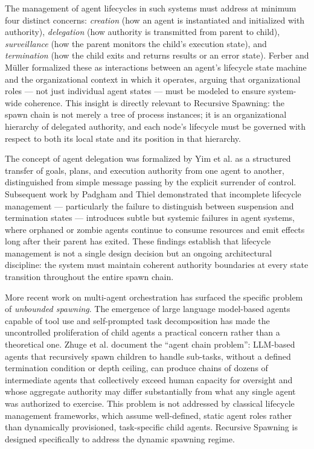The management of agent lifecycles in such systems must address at minimum four distinct concerns: \emph{creation} (how an agent is instantiated and initialized with authority), \emph{delegation} (how authority is transmitted from parent to child), \emph{surveillance} (how the parent monitors the child's execution state), and \emph{termination} (how the child exits and returns results or an error state). Ferber and M\"uller \cite{ferber1996} formalized these as interactions between an agent's lifecycle state machine and the organizational context in which it operates, arguing that organizational roles --- not just individual agent states --- must be modeled to ensure system-wide coherence. This insight is directly relevant to Recursive Spawning: the spawn chain is not merely a tree of process instances; it is an organizational hierarchy of delegated authority, and each node's lifecycle must be governed with respect to both its local state and its position in that hierarchy.

The concept of agent delegation was formalized by Yim et al. \cite{yim1997} as a structured transfer of goals, plans, and execution authority from one agent to another, distinguished from simple message passing by the explicit surrender of control. Subsequent work by Padgham and Thiel \cite{padgham2001} demonstrated that incomplete lifecycle management --- particularly the failure to distinguish between suspension and termination states --- introduces subtle but systemic failures in agent systems, where orphaned or zombie agents continue to consume resources and emit effects long after their parent has exited. These findings establish that lifecycle management is not a single design decision but an ongoing architectural discipline: the system must maintain coherent authority boundaries at every state transition throughout the entire spawn chain.

More recent work on multi-agent orchestration has surfaced the specific problem of \emph{unbounded spawning}. The emergence of large language model-based agents capable of tool use and self-prompted task decomposition has made the uncontrolled proliferation of child agents a practical concern rather than a theoretical one. Zhuge et al. \cite{zhuge2024} document the ``agent chain problem'': LLM-based agents that recursively spawn children to handle sub-tasks, without a defined termination condition or depth ceiling, can produce chains of dozens of intermediate agents that collectively exceed human capacity for oversight and whose aggregate authority may differ substantially from what any single agent was authorized to exercise. This problem is not addressed by classical lifecycle management frameworks, which assume well-defined, static agent roles rather than dynamically provisioned, task-specific child agents. Recursive Spawning is designed specifically to address the dynamic spawning regime.


